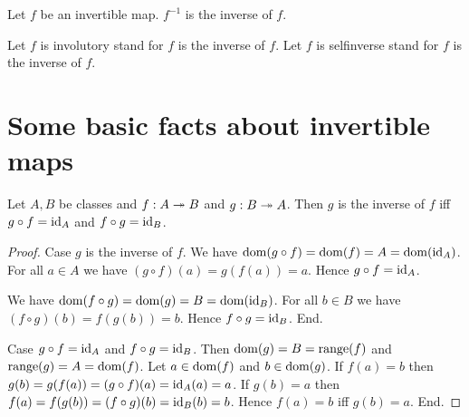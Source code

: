 \documentclass[../../set-theory/set-theory.tex]{subfiles}
\begin{document}
  \begin{forthel}
    \begin{definition}
      Let $f$ be an invertible map.
      $f^{-1}$ is the inverse of $f$.
    \end{definition}

    Let $f$ is involutory stand for $f$ is the inverse of $f$.
    Let $f$ is selfinverse stand for $f$ is the inverse of $f$.
  \end{forthel}


  \section{Some basic facts about invertible maps}

  \begin{forthel}
    \begin{proposition}
      Let $A, B$ be classes and $f : A \twoheadrightarrow B$ and $g : B \twoheadrightarrow A$.
      Then $g$ is the inverse of $f$ iff $g \circ f = \operatorname{id}_{A}$ and $f \circ g =
      \operatorname{id}_{B}$.
    \end{proposition}
    \begin{proof}
      Case $g$ is the inverse of $f$.
        We have
        $\operatorname{dom}(g \circ f)
          = \operatorname{dom}(f)
          = A
          = \operatorname{dom}(\operatorname{id}_{A})$.
        For all $a \in A$ we have
        $(g \circ f)(a)
          = g(f(a))
          = a$.
        Hence $g \circ f = \operatorname{id}_{A}$.

        We have
        $\operatorname{dom}(f \circ g)
          = \operatorname{dom}(g)
          = B
          = \operatorname{dom}(\operatorname{id}_{B})$.
        For all $b \in B$ we have
        $(f \circ g)(b)
          = f(g(b))
          = b$.
        Hence $f \circ g = \operatorname{id}_{B}$.
      End.

      Case $g \circ f = \operatorname{id}_{A}$ and $f \circ g = \operatorname{id}_{B}$.
        Then $\operatorname{dom}(g)
          = B
          = \operatorname{range}(f)$
        and $\operatorname{range}(g)
          = A
          = \operatorname{dom}(f)$.
        Let $a \in \operatorname{dom}(f)$ and $b \in \operatorname{dom}(g)$.
        If $f(a) = b$ then
        $g(b)
          = g(f(a))
          = (g \circ f)(a)
          = \operatorname{id}_{A}(a)
          = a$.
        If $g(b) = a$ then
        $f(a)
          = f(g(b))
          = (f \circ g)(b)
          = \operatorname{id}_{B}(b)
          = b$.
        Hence $f(a) = b$ iff $g(b) = a$.
      End.
    \end{proof}
  \end{forthel}
\end{document}
